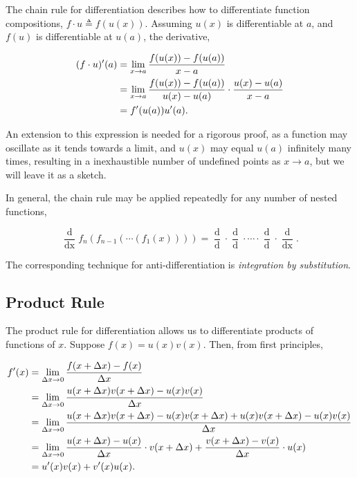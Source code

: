\documentclass[11pt]{amsart}
\begin{document}
The chain rule for differentiation describes how to differentiate function compositions, $f \cdot u \triangleq f(u(x))$. Assuming $u(x)$ is differentiable at $a$, and $f(u)$ is differentiable at $u(a)$, the derivative,

\begin{align}
(f \cdot u)'(a) &= \lim_{x \to a}\frac{f(u(x)) - f(u(a))}{x - a} \notag \\
&= \lim_{x \to a}\frac{f(u(x)) - f(u(a))}{u(x) - u(a)} \cdot \frac{u(x) - u(a)}{x - a} \notag \\
&= f'(u(a))u'(a). \notag
\end{align}

An extension to this expression is needed for a rigorous proof, as a function may oscillate as it tends towards a limit, and $u(x)$ may equal $u(a)$ infinitely many times, resulting in a inexhaustible number of undefined points as $x \to a$, but we will leave it as a sketch.

In general, the chain rule may be applied repeatedly for any number of nested functions,

$$\frac{\mathop{d}}{\mathop{dx}} f_n(f_{n-1}(\cdots (f_1(x)))) = \frac{\mathop{df_n}}{\mathop{df_{n-1}}}\cdot \frac{\mathop{df_{n-1}}}{\mathop{df_{n-2}}} \cdot \cdots \cdot \frac{\mathop{df_2}}{\mathop{df_1}}\cdot \frac{\mathop{df_1}}{\mathop{dx}}.$$

The corresponding technique for anti-differentiation is \emph{integration by substitution}.

\subsection{Product Rule}

The product rule for differentiation allows us to differentiate products of functions of $x$. Suppose $f(x) = u(x)v(x)$. Then, from first principles,

\begin{align}
f'(x) &= \lim_{\Delta x \to 0} \frac{f(x + \Delta x) - f(x)}{\Delta x} \notag \\
&= \lim_{\Delta x \to 0} \frac{u(x + \Delta x)v(x + \Delta x) - u(x)v(x)}{\Delta x} \notag \\
&= \lim_{\Delta x \to 0} \frac{u(x + \Delta x)v(x + \Delta x) - u(x)v(x + \Delta x) + u(x)v(x + \Delta x) - u(x)v(x)}{\Delta x} \notag \\
&= \lim_{\Delta x \to 0} \frac{u(x + \Delta x) - u(x)}{\Delta x}\cdot v(x + \Delta x) + \frac{v(x + \Delta x) - v(x)}{\Delta x}\cdot u(x)\notag \\
&= u'(x)v(x) + v'(x)u(x). \notag
\end{align}
\end{document}
